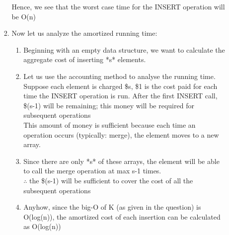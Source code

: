 \documentclass[11pt]{article}
\begin{document}
\begin{enumerate}
\begin{enumerate}
\begin{enumerate}
\begin{enumerate}
            \end{enumerate}
            Hence, we see that the worst case time for the INSERT operation will be O(n)
            \item Now let us analyze the amortized running time:
            \begin{enumerate}
                \item Beginning with an empty data structure, we want to calculate the aggregate cost of inserting *s* elements. 
                \item Let us use the accounting method to analyse the running time.\\
                Suppose each element is charged \$s, \$1 is the cost paid for each time the INSERT operation is run. After the first INSERT call, \$(s-1) will be remaining; this money will be required for subsequent operations\\
                This amount of money is sufficient because each time an operation occurs (typically: merge), the element moves to a new array. \item Since there are only *s* of these arrays, the element will be able to call the merge operation at max s-1 times.\\ $\therefore$ the \$(s-1) will be sufficient to cover the cost of all the subsequent operations
                \item Anyhow, since the big-O of K (as given in the question) is O(log(n)), the amortized cost of each insertion can be calculated as O(log(n))
            \end{enumerate}
        \end{enumerate}
    
    \end{enumerate}
    
\end{enumerate}
\pagebreak
\end{document}
